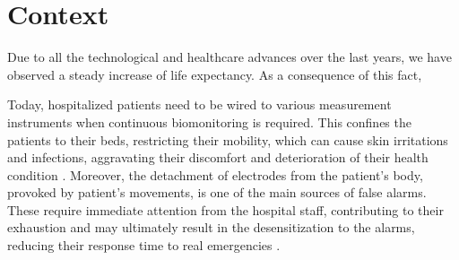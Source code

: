 

\section{Context}

Due to all the technological and healthcare advances over the last years, we have observed a steady increase of life expectancy. As a consequence of this fact, 




Today, hospitalized patients need to be wired to various measurement instruments when continuous biomonitoring is required. This confines the patients to their beds, restricting their mobility, which can cause skin irritations and infections, aggravating their discomfort and deterioration of their health condition \cite{Darwish2011}. Moreover, the detachment of electrodes from the patient's body, provoked by patient's movements, is one of the main sources of false alarms. These require immediate attention from the hospital staff, contributing to their exhaustion and may ultimately result in the desensitization to the alarms, reducing their response time to real emergencies \cite{DursunErgezen2020}.


